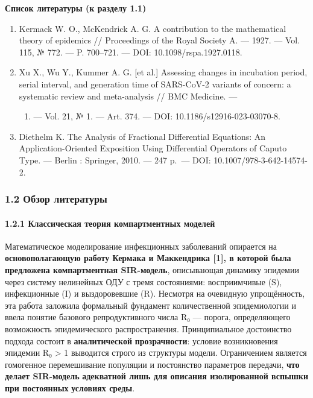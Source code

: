 \documentclass[12pt]{article}
\begin{document}
\textbf{Список литературы (к разделу 1.1)}

\begin{enumerate}
\def\labelenumi{\arabic{enumi}.}
\item
  Kermack W. O., McKendrick A. G. A contribution to the mathematical
  theory of epidemics // Proceedings of the Royal Society A. --- 1927.
  --- Vol. 115, № 772. --- P. 700--721. --- DOI: 10.1098/rspa.1927.0118.
\item
  Xu X., Wu Y., Kummer A. G. {[}et al.{]} Assessing changes in
  incubation period, serial interval, and generation time of SARS-CoV-2
  variants of concern: a systematic review and meta-analysis // BMC
  Medicine. ---

  \begin{enumerate}
  \def\labelenumii{\arabic{enumii}.}
  \setcounter{enumii}{2}

  \tightlist
  
  \item
    --- Vol. 21, № 1. --- Art. 374. --- DOI: 10.1186/s12916-023-03070-8.
  \end{enumerate}
\item
  Diethelm K. The Analysis of Fractional Differential Equations: An
  Application-Oriented Exposition Using Differential Operators of Caputo
  Type. --- Berlin : Springer, 2010. --- 247 p.~--- DOI:
  10.1007/978-3-642-14574-2.
\end{enumerate}

\subsubsection{1.2 Обзор
литературы}\label{ux43eux431ux437ux43eux440-ux43bux438ux442ux435ux440ux430ux442ux443ux440ux44b}

\paragraph{1.2.1 Классическая теория компартментных
моделей}\label{ux43aux43bux430ux441ux441ux438ux447ux435ux441ux43aux430ux44f-ux442ux435ux43eux440ux438ux44f-ux43aux43eux43cux43fux430ux440ux442ux43cux435ux43dux442ux43dux44bux445-ux43cux43eux434ux435ux43bux435ux439}

Математическое моделирование инфекционных заболеваний опирается на
\textbf{основополагающую работу Кермака и Маккендрика {[}1{]}, в которой
была} \textbf{предложена компартментная SIR-модель}, описывающая
динамику эпидемии через систему нелинейных ОДУ с тремя состояниями:
восприимчивые (S), инфекционные (I) и выздоровевшие (R). Несмотря на
очевидную упрощённость, эта работа заложила формальный фундамент
количественной эпидемиологии и ввела понятие базового репродуктивного
числа R₀ --- порога, определяющего возможность эпидемического
распространения. Принципиальное достоинство подхода состоит в
\textbf{аналитической} \textbf{прозрачности}: условие возникновения
эпидемии R₀ \textgreater{} 1 выводится строго из структуры модели.
Ограничением является гомогенное перемешивание популяции и постоянство
параметров передачи, \textbf{что делает SIR-модель} \textbf{адекватной
лишь для описания изолированной вспышки при постоянных} \textbf{условиях
среды}.
\end{document}
